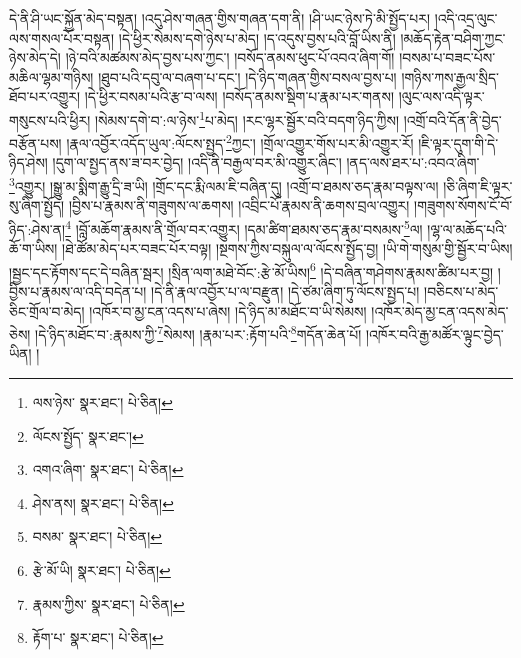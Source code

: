 དེ་ནི་ཤི་ཡང་སྐྱོན་མེད་བསྟན། །འདུ་ཤེས་གཞན་གྱིས་གཞན་དག་ནི། །ཤི་ཡང་ཉེས་ཏེ་མི་སྤྱོད་པར། །འདི་འདྲ་ལུང་ལས་གསལ་པོར་བསྟན། །དེ་ཕྱིར་སེམས་དགེ་ཉེས་པ་མེད། །ད་འདུས་བྱས་པའི་བློ་ཡིས་ནི། །མཆོད་རྟེན་བཤིག་ཀྱང་ཉེས་མེད་དེ། །ཉེ་བའི་མཚམས་མེད་བྱས་པས་ཀྱང་། །བསོད་ནམས་ཕུང་པོ་འབའ་ཞིག་གོ། །བསམ་པ་བཟང་པོས་མཆིལ་ལྷམ་གཉིས། །ཐུབ་པའི་དབུ་ལ་བཞག་པ་དང་། །དེ་ཉིད་གཞན་གྱིས་བསལ་བྱས་པ། །གཉིས་ཀས་རྒྱལ་སྲིད་ཐོབ་པར་འགྱུར། །དེ་ཕྱིར་བསམ་པའི་རྩ་བ་ལས། །བསོད་ནམས་སྡིག་པ་རྣམ་པར་གནས། །ལུང་ལས་འདི་ལྟར་གསུངས་པའི་ཕྱིར། །སེམས་དགེ་བ་:ལ་ཉེས་\footnote{ལས་ཉེས་  སྣར་ཐང་།  པེ་ཅིན། }པ་མེད། །རང་ལྷར་སྦྱོར་བའི་བདག་ཉིད་ཀྱིས། །འགྲོ་བའི་དོན་ནི་བྱེད་བརྩོན་པས། །རྣལ་འབྱོར་འདོད་ཡུལ་:ལོངས་སྤྱད་\footnote{ལོངས་སྤྱོད་  སྣར་ཐང་། }ཀྱང་། །གྲོལ་འགྱུར་གོས་པར་མི་འགྱུར་རོ། །ཇི་ལྟར་དུག་གི་དེ་ཉིད་ཤེས། །དུག་ལ་སྤྱད་ནས་ཟ་བར་བྱེད། །འདི་ནི་བརྒྱལ་བར་མི་འགྱུར་ཞིང་། །ནད་ལས་ཐར་པ་:འབའ་ཞིག་\footnote{འགའ་ཞིག་  སྣར་ཐང་།  པེ་ཅིན། }འགྱུར། །སྒྱུ་མ་སྨིག་རྒྱུ་དྲི་ཟ་ཡི། །གྲོང་དང་རྨི་ལམ་ཇི་བཞིན་དུ། །འགྲོ་བ་ཐམས་ཅད་རྣམ་བལྟས་ལ། །ཅི་ཞིག་ཇི་ལྟར་སུ་ཞིག་སྤྱོད། །བྱིས་པ་རྣམས་ནི་གཟུགས་ལ་ཆགས། །འབྲིང་པོ་རྣམས་ནི་ཆགས་བྲལ་འགྱུར། །གཟུགས་སོགས་ངོ་བོ་ཉིད་:ཤེས་ན།\footnote{ཤེས་ནས།  སྣར་ཐང་།  པེ་ཅིན། } །བློ་མཆོག་རྣམས་ནི་གྲོལ་བར་འགྱུར། །དམ་ཚིག་ཐམས་ཅད་རྣམ་བསམས་\footnote{བསམ་  སྣར་ཐང་།  པེ་ཅིན། }ལ། །ལྷ་ལ་མཆོད་པའི་ཆོ་ག་ཡིས། །ཐེ་ཚོམ་མེད་པར་བཟང་པོར་བལྟ། །སྔགས་ཀྱིས་བསྐུལ་ལ་ལོངས་སྤྱོད་བྱ། །ཡི་གེ་གསུམ་གྱི་སྦྱོར་བ་ཡིས། །སྦྱང་དང་རྟོགས་དང་དེ་བཞིན་སྦར། །སྲིན་ལག་མཐེ་བོང་:རྩེ་མོ་ཡིས།\footnote{རྩེ་མོ་ཡི།  སྣར་ཐང་།  པེ་ཅིན། } །དེ་བཞིན་གཤེགས་རྣམས་ཚིམ་པར་བྱ། །བྱིས་པ་རྣམས་ལ་འདི་བདེན་པ། །དེ་ནི་རྣལ་འབྱོར་པ་ལ་བརྫུན། །དེ་ཙམ་ཞིག་ཏུ་ལོངས་སྤྱད་པ། །བཅིངས་པ་མེད་ཅིང་གྲོལ་བ་མེད། །འཁོར་བ་མྱ་ངན་འདས་པ་ཞེས། །དེ་ཉིད་མ་མཐོང་བ་ཡི་སེམས། །འཁོར་མེད་མྱ་ངན་འདས་མེད་ཅེས། །དེ་ཉིད་མཐོང་བ་:རྣམས་ཀྱི་\footnote{རྣམས་ཀྱིས་  སྣར་ཐང་།  པེ་ཅིན། }སེམས། །རྣམ་པར་:རྟོག་པའི་\footnote{རྟོག་པ་  སྣར་ཐང་།  པེ་ཅིན། }གདོན་ཆེན་པོ། །འཁོར་བའི་རྒྱ་མཚོར་ལྟུང་བྱེད་ཡིན། །
